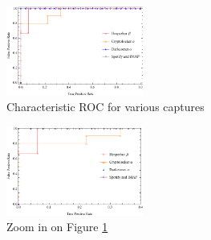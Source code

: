 \documentclass[9pt,journal,compsoc]{IEEEtran}
\begin{document}
\begin{figure}[!h]
 \centering
 \includegraphics[width=0.4\textwidth]{roc1.pdf}
 \caption{Characteristic ROC for various captures \label{fig:roc1}}
\end{figure} 

\begin{figure}[!h]
 \centering
 \includegraphics[width=0.4\textwidth]{roc2.pdf}
 \caption{Zoom in on Figure \ref{fig:roc1} \label{fig:roc2}}
\end{figure} 
\end{document}
